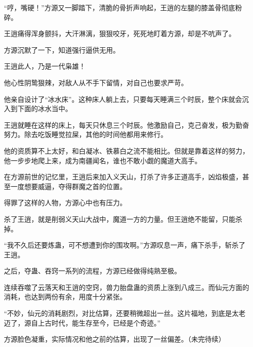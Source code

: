 \begin{this_body}
“哼，嘴硬！”方源又一脚踏下，清脆的骨折声响起，王逍的左腿的膝盖骨彻底粉碎。

王逍痛得浑身颤抖，大汗淋漓，狠狠咬牙，死死地盯着方源，却是不吭声了。

方源沉默了一下，知道强行逼供无用。

王逍此人，乃是一代枭雄！

他心性阴鸷狠辣，对敌人从不手下留情，对自己也要求严苛。

他亲自设计了“冰水床”。这种床人躺上去，只要每天睡满三个时辰，整个床就会沉入到下面的冰水当中。

王逍就睡在这样的床上，每天只休息三个时辰。他激励自己，克己奋发，极为勤奋努力。除去吃饭睡觉拉屎，其他的时间他都用来修行。

他的资质算不上太好，和白凝冰、铁慕白之流不能相比。但就是靠着这样的努力，他一步步地爬上来，成为南疆闻名，谁也不敢小觑的魔道大高手。

在方源前世的记忆里，王逍后来加入义天山，打杀了许多正道高手，凶焰极盛，甚至一度想要威逼，夺得群魔之首的位置。

得罪了这样的人物，方源心中也有压力。

杀了王逍，就是削弱义天山大战中，魔道一方的力量。但王逍绝不能留，只能杀掉。

“我不久后还要炼蛊，可不想遭到你的围攻啊。”方源叹息一声，痛下杀手，斩杀了王逍。

之后，夺蛊、吞窍一系列的流程，方源已经做得纯熟至极。

连续吞噬了云落天和王逍的空窍，兽力胎盘蛊的资质上涨到八成三。而仙元方面的消耗，也达到两份有余，用度十分紧张。

“不妙，仙元的消耗剧烈，对比估算，还要稍微超出一丝。这片福地，到底是太老迈了，源自上古时代，能生存至今，已经是个奇迹。”

方源脸色凝重，实际情况和他之前的估算，出现了一丝偏差。（未完待续）

\end{this_body}

